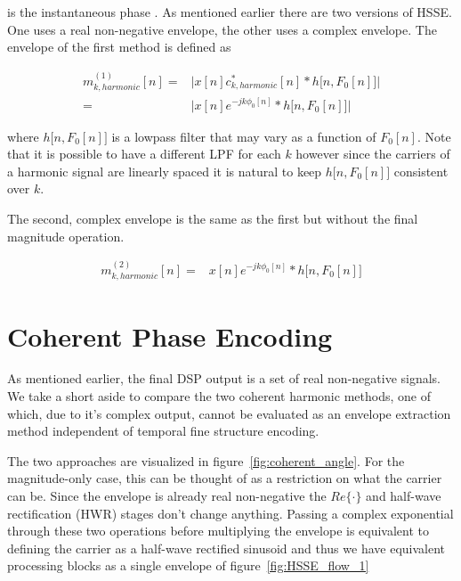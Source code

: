 \documentclass [11pt, proquest,oneside] {ganter_thesis}[2015/03/03]
\begin{document}
is the instantaneous phase \cite{clark2010modulation}.  As mentioned earlier there are two versions of HSSE. One uses a real non-negative envelope, the other uses a complex envelope.  The envelope of the first method is defined as

\begin{align}
m^{(1)}_{k,harmonic}[n] =& \Big| x[n] c_{k,harmonic}^*[n] * h\big[n, F_0[n] \big] \Big| \nonumber \\
=& \Big| x[n] e^{-jk\phi_0 [n]} * h\big[n, F_0[n] \big] \Big|
\end{align}

where $h\big[n, F_0[n] \big]$ is a lowpass filter that may vary as a function of $F_0[n]$.  Note that it is possible to have a different LPF for each $k$ however since the carriers of a harmonic signal are linearly spaced it is natural to keep $h\big[n, F_0[n] \big]$ consistent over $k$.

The second, complex envelope is the same as the first but without the final magnitude operation.

\begin{align}
m^{(2)}_{k,harmonic}[n] =& x[n] e^{-jk\phi_0 [n]} * h\big[n, F_0[n] \big]
\end{align}

\section{Coherent Phase Encoding}\label{section:coherent_phase}

As mentioned earlier, the final DSP output is a set of real non-negative signals.  We take a short aside to compare the two coherent harmonic methods, one of which, due to it's complex output, cannot be evaluated as an envelope extraction method independent of temporal fine structure encoding.

The two approaches are visualized in figure~\ref{fig:coherent_angle}.  For the magnitude-only case, this can be thought of as a restriction on what the carrier can be.  Since the envelope is already real non-negative the $Re\{\cdot\}$ and half-wave rectification (HWR) stages don't change anything.  Passing a complex exponential through these two operations before multiplying the envelope is equivalent to defining the carrier as a half-wave rectified sinusoid and thus we have equivalent processing blocks as a single envelope of figure~\ref{fig:HSSE_flow_1}
\end{document}
